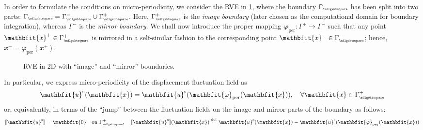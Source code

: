 \documentclass[12pt,a4paper]{article}
\renewcommand{\ta}[1]{\mathbfit{#1}}
\renewcommand{\Box}{\mdlgwhtsquare}
\DeclarePairedDelimiter{\jmp}{[\![}{]\!]}
\newcommand{\per}{\mathrm{per}}
\newcommand{\rve}{
  {\mathchoice
   {\mbox{\scalebox{0.67}{$\Box$}}}
   {\mbox{\scalebox{0.67}{$\Box$}}}
   {\mbox{\scalebox{0.5}{$\Box$}}}
   {\mbox{\scalebox{0.375}{$\Box$}}}
  }
}
\begin{document}
In order to formulate the conditions on micro-periodicity, we consider the RVE in \cref{Figure2}, where the boundary $\Gamma_\rve$ has been split into two parts: $\Gamma_\rve=\Gamma_\rve^- \cup \Gamma_\rve^+$.
Here, $\Gamma_\rve^+$ is the \emph{image boundary} (later chosen as the computational domain for boundary integration), whereas $\Gamma^-$ is the \emph{mirror boundary}.
We shall now introduce the proper mapping $\ta{\varphi}_\per:\Gamma^+ \rightarrow \Gamma^-$ such that any point $\ta{x}^+\in\Gamma_\rve^+$ is mirrored in a self-similar fashion to the corresponding point $\ta{x}^-\in\Gamma_\rve^-$; hence, $\ta{x}^-=\ta{\varphi}_\per(\ta{x}^+)$.
\begin{figure}[H]
\centering
{}
\caption{RVE in 2D with ``image'' and ``mirror'' boundaries.}
\label{Figure2}
\end{figure}
In particular, we express micro-periodicity of the displacement fluctuation field as
\begin{equation}
    \ta{u}^\fluct(\ta{x}) = \ta{u}^\fluct(\ta{\varphi}_\per(\ta{x})), \quad
    \forall \ta{x}\in\Gamma_\rve^+
\label{eq21}
\end{equation}
or, equivalently, in terms of the ``jump'' between the fluctuation fields on the image and mirror parts of the boundary as follows:
\begin{equation}
    \jmp{\ta{u}^\fluct} = \ta{0} \quad \makebox{on } \Gamma_\rve^+, \quad
    \jmp{\ta{u}^\fluct}(\ta{x}) \defeq \ta{u}^\fluct(\ta{x})-\ta{u}^\fluct(\ta{\varphi}_\per(\ta{x}))
\label{eq22}
\end{equation}
\end{document}
